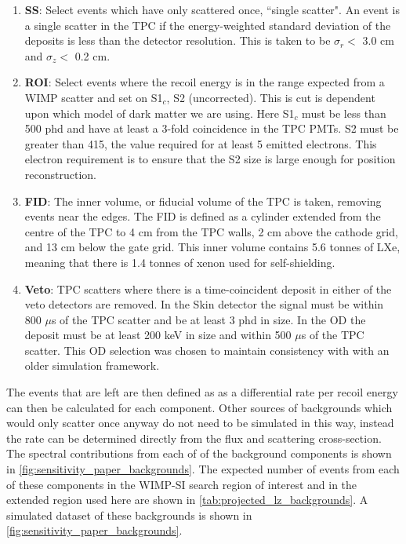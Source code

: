 \begin{enumerate}
    \item \textbf{SS}: Select events which have only scattered once, ``single scatter". An event is a single scatter in the TPC if the energy-weighted standard deviation of the deposits is less than the detector resolution. This is taken to be $\sigma_r <$ 3.0 cm and $\sigma_z <$ 0.2 cm.
    \item \textbf{ROI}: Select events where the recoil energy is in the range expected from a WIMP scatter and set on S1$_c$, S2 (uncorrected). This is cut is dependent upon which model of dark matter we are using. Here S1$_c$ must be less than 500 phd and have at least a 3-fold coincidence in the TPC PMTs. S2 must be greater than 415, the value required for at least 5 emitted electrons. This electron requirement is to ensure that the S2 size is large enough for position reconstruction.
    \item \textbf{FID}: The inner volume, or fiducial volume of the TPC is taken, removing events near the edges. The FID is defined as a cylinder extended from the centre of the TPC to 4 cm from the TPC walls, 2 cm above the cathode grid, and 13 cm below the gate grid. This inner volume contains 5.6 tonnes of LXe, meaning that there is 1.4 tonnes of xenon used for self-shielding.
    \item \textbf{Veto}: TPC scatters where there is a time-coincident deposit in either of the veto detectors are removed. In the Skin detector the signal must be within 800 $\mu$s of the TPC scatter and be at least 3 phd in size. In the OD the deposit must be at least 200 keV in size and within 500 $\mu$s of the TPC scatter. This OD selection was chosen to maintain consistency with \cite{LZ_projected_sensitivity_paper_ref} with an older simulation framework.
\end{enumerate}
The events that are left are then defined as as a differential rate per recoil energy can then be calculated for each component.
Other sources of backgrounds which would only scatter once anyway do not need to be simulated in this way, instead the rate can be determined directly from the flux and scattering cross-section.
The spectral contributions from each of of the background components is shown in \autoref{fig:sensitivity_paper_backgrounds}.
The expected number of events from each of these components in the WIMP-SI search region of interest and in the extended region used here are shown in 
\autoref{tab:projected_lz_backgrounds}.
A simulated dataset of these backgrounds is shown in  \autoref{fig:sensitivity_paper_backgrounds}.

